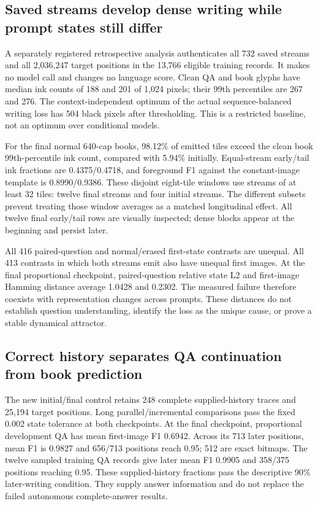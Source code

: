 \documentclass[12pt,a4paper]{article}
\providecommand{\DIFadd}[1]{{\protect\color{blue} \sf #1}} %
\begin{document}
\subsection*{\DIFadd{Saved streams develop dense writing while prompt states still differ}}
\DIFadd{A separately registered retrospective analysis authenticates all 732 saved
streams and all 2,036,247 target positions in the 13,766 eligible training
records. It makes no model call and changes no language score. Clean QA and
book glyphs have median ink counts of 188 and 201 of 1,024 pixels; their
99th percentiles are 267 and 276. The context-independent optimum of the actual
sequence-balanced writing loss has 504 black pixels after thresholding.
This is a restricted baseline, not an optimum over conditional models.
}

\DIFadd{For the final normal 640-cap books, 98.12\% of emitted tiles exceed the clean
book 99th-percentile ink count, compared with 5.94\% initially. Equal-stream
early/tail ink fractions are 0.4375/0.4718, and foreground F1 against the
constant-image template is 0.8990/0.9386. These disjoint eight-tile windows use
streams of at least 32 tiles: twelve final streams and four initial streams.
The different subsets prevent treating those window averages as a matched
longitudinal effect. All twelve final early/tail rows are visually inspected;
dense blocks appear at the beginning and persist later.
}

\DIFadd{All 416 paired-question and normal/erased first-state contrasts are unequal.
All 413 contrasts in which both streams emit also have unequal first images.
At the final proportional checkpoint, paired-question relative state L2 and
first-image Hamming distance average 1.0428 and 0.2302. The measured failure
therefore coexists with representation changes across prompts. These distances
do not establish question understanding, identify the loss as the unique cause,
or prove a stable dynamical attractor.
}

\subsection*{\DIFadd{Correct history separates QA continuation from book prediction}}
\DIFadd{The new initial/final control retains 248 complete supplied-history traces and
25,194 target positions. Long parallel/incremental comparisons pass the fixed
0.002 state tolerance at both checkpoints. At the final checkpoint, proportional
development QA has mean first-image F1 0.6942. Across its 713 later positions,
mean F1 is 0.9827 and 656/713 positions reach 0.95; 512 are exact bitmaps.
The twelve sampled training QA records give later mean F1 0.9905 and 358/375
positions reaching 0.95. These supplied-history fractions pass the descriptive
90\% later-writing condition. They supply answer information and do not
replace the failed autonomous complete-answer results.
}
\end{document}
